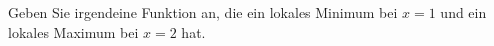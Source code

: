 \item
Geben Sie irgendeine Funktion an, die ein lokales Minimum bei $x=1$ und ein lokales Maximum bei $x=2$ hat.

